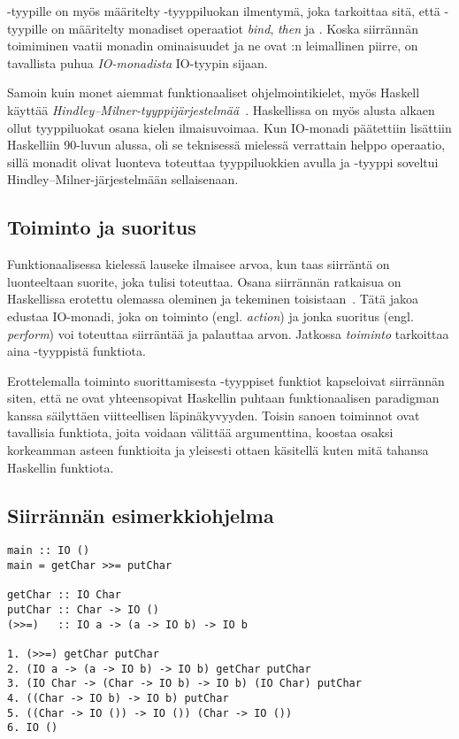 \documentclass[finnish]{tktltiki2}
\begin{document}
-tyypille on myös määritelty -tyyppiluokan ilmentymä, joka tarkoittaa sitä,
että -tyypille on määritelty monadiset operaatiot \emph{bind}, \emph{then} ja
. Koska siirrännän toimiminen vaatii monadin ominaisuudet ja ne ovat :n
leimallinen piirre, on tavallista puhua \emph{IO-monadista} IO-tyypin sijaan.

Samoin kuin monet aiemmat funktionaaliset ohjelmointikielet, myös Haskell käyttää
\emph{Hindley--Milner-tyyppijärjestelmää}~\cite{hoh07}. Haskellissa on myös alusta alkaen ollut
tyyppiluokat osana kielen ilmaisuvoimaa. Kun IO-monadi päätettiin lisättiin Haskelliin 90-luvun
alussa, oli se teknisessä mielessä verrattain helppo operaatio, sillä monadit olivat luonteva
toteuttaa tyyppiluokkien avulla ja -tyyppi soveltui Hindley--Milner-järjestelmään
sellaisenaan.

\subsection{Toiminto ja suoritus}

Funktionaalisessa kielessä lauseke ilmaisee arvoa, kun taas siirräntä on luonteeltaan suorite, joka
tulisi toteuttaa. Osana siirrännän ratkaisua on Haskellissa erotettu olemassa oleminen ja tekeminen
toisistaan~\cite{ifp93}. Tätä jakoa edustaa IO-monadi, joka on toiminto (engl. \emph{action}) ja
jonka suoritus (engl. \emph{perform}) voi toteuttaa siirräntää ja palauttaa arvon. Jatkossa
\emph{toiminto} tarkoittaa aina -tyyppistä funktiota.

Erottelemalla toiminto suorittamisesta -tyyppiset funktiot kapseloivat siirrännän siten,
että ne ovat yhteensopivat Haskellin puhtaan funktionaalisen paradigman kanssa säilyttäen
viitteellisen läpinäkyvyyden. Toisin sanoen toiminnot ovat tavallisia funktiota, joita voidaan
välittää argumenttina, koostaa osaksi korkeamman asteen funktioita ja yleisesti ottaen käsitellä
kuten mitä tahansa Haskellin funktiota.

\subsection{Siirrännän esimerkkiohjelma}

\begin{lstlisting}[float,label={lst:ioprog},caption={IO-ohjelma ja sen evaluaatio}]
main :: IO ()
main = getChar >>= putChar

getChar :: IO Char
putChar :: Char -> IO ()
(>>=)   :: IO a -> (a -> IO b) -> IO b

1. (>>=) getChar putChar
2. (IO a -> (a -> IO b) -> IO b) getChar putChar
3. (IO Char -> (Char -> IO b) -> IO b) (IO Char) putChar
4. ((Char -> IO b) -> IO b) putChar
5. ((Char -> IO ()) -> IO ()) (Char -> IO ())
6. IO ()
\end{lstlisting}
\end{document}
